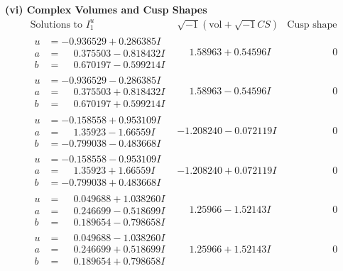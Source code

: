 \documentclass[1p]{elsarticle_modified}
\theoremstyle{definition}
\newcommand{\I}{\sqrt{-1}}
\begin{document}
\newpage\flushleft \textbf{(vi) Complex Volumes and Cusp Shapes}
$$\begin{array}{c|c|c}  
\text{Solutions to }I^u_{1}& \I (\text{vol} + \sqrt{-1}CS) & \text{Cusp shape}\\
 \hline 
\begin{aligned}
u &= -0.936529 + 0.286385 I \\
a &= \phantom{-}0.375503 - 0.818432 I \\
b &= \phantom{-}0.670197 - 0.599214 I\end{aligned}
 & \phantom{-}1.58963 + 0.54596 I & \phantom{-0.000000 } 0 \\ \hline\begin{aligned}
u &= -0.936529 - 0.286385 I \\
a &= \phantom{-}0.375503 + 0.818432 I \\
b &= \phantom{-}0.670197 + 0.599214 I\end{aligned}
 & \phantom{-}1.58963 - 0.54596 I & \phantom{-0.000000 } 0 \\ \hline\begin{aligned}
u &= -0.158558 + 0.953109 I \\
a &= \phantom{-}1.35923 - 1.66559 I \\
b &= -0.799038 - 0.483668 I\end{aligned}
 & -1.208240 - 0.072119 I & \phantom{-0.000000 } 0 \\ \hline\begin{aligned}
u &= -0.158558 - 0.953109 I \\
a &= \phantom{-}1.35923 + 1.66559 I \\
b &= -0.799038 + 0.483668 I\end{aligned}
 & -1.208240 + 0.072119 I & \phantom{-0.000000 } 0 \\ \hline\begin{aligned}
u &= \phantom{-}0.049688 + 1.038260 I \\
a &= \phantom{-}0.246699 - 0.518699 I \\
b &= \phantom{-}0.189654 - 0.798658 I\end{aligned}
 & \phantom{-}1.25966 - 1.52143 I & \phantom{-0.000000 } 0 \\ \hline\begin{aligned}
u &= \phantom{-}0.049688 - 1.038260 I \\
a &= \phantom{-}0.246699 + 0.518699 I \\
b &= \phantom{-}0.189654 + 0.798658 I\end{aligned}
 & \phantom{-}1.25966 + 1.52143 I & \phantom{-0.000000 } 0 \\ \hline\begin{aligned}

\end{aligned}
\end{array}$$
\end{document}
